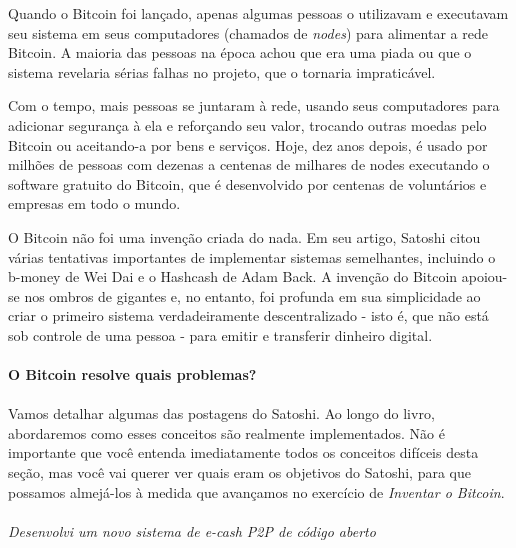 Quando o Bitcoin foi lançado, apenas algumas pessoas o utilizavam e executavam seu sistema em seus computadores (chamados de \textit{nodes}) para alimentar a rede Bitcoin. A maioria das pessoas na época achou que era uma piada ou que o sistema revelaria sérias falhas no projeto, que o tornaria impraticável.

Com o tempo, mais pessoas se juntaram à rede, usando seus computadores para adicionar segurança à ela e reforçando seu valor, trocando outras moedas pelo Bitcoin ou aceitando-a por bens e serviços. Hoje, dez anos depois, é usado por milhões de pessoas com dezenas a centenas de milhares de nodes executando o software gratuito do Bitcoin, que é desenvolvido por centenas de voluntários e empresas em todo o mundo.

O Bitcoin não foi uma invenção criada do nada. Em seu artigo, Satoshi citou várias tentativas importantes de implementar sistemas semelhantes, incluindo o b-money de Wei Dai e o Hashcash de Adam Back. A invenção do Bitcoin apoiou-se nos ombros de gigantes e, no entanto, foi profunda em sua simplicidade ao criar o primeiro sistema verdadeiramente descentralizado - isto é, que não está sob controle de uma pessoa - para emitir e transferir dinheiro digital.

\newpage
\paragraph{O Bitcoin resolve quais problemas?}
\paragraph{}
 
Vamos detalhar algumas das postagens do Satoshi. Ao longo do livro, abordaremos como esses conceitos são realmente implementados. Não é importante que você entenda imediatamente todos os conceitos difíceis desta seção, mas você vai querer ver quais eram os objetivos do Satoshi, para que possamos almejá-los à medida que avançamos no exercício de \textit{Inventar o Bitcoin}.

\paragraph{}
\textit{Desenvolvi um novo sistema de e-cash P2P de código aberto}
\paragraph{}

